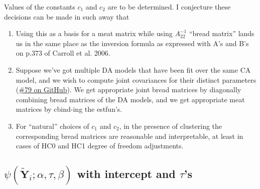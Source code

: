 \documentclass{article}
\begin{document}
Values of the constants $c_{1}$ and $c_{2}$ are to be determined.
I conjecture these decisions can be made in such away that 
\begin{enumerate}
\item Using this as a basis for a meat matrix while using
  $A_{22}^{-1}$  ``bread matrix'' lands us in the same place as the
  inversion formula as expressed with A's and B's on p.373 of Carroll
  et al. 2006.
\item Suppose we've got multiple DA models that have been fit over the
  same CA model, and we wish to compute joint covariances for their
  distinct parameters
  (\href{https://github.com/benbhansen-stats/flexida/issues/79}{\#79
    on GitHub}). We get appropriate joint bread matrices by
  diagonally combining bread matrices of the DA models, and we get
  appropriate meat matrices by cbind-ing the estfun's.
\item For ``natural'' choices of $c_{1}$ and $c_{2}$, in the
  presence of clustering the corresponding bread matrices are
  reasonable and interpretable, at least in cases of HC0 and HC1
  degree of freedom adjustments. 
\end{enumerate}

\subsection{$\psi(\tilde{\mathbf{Y}}_{i};
  \alpha, \tau, \beta)$ with intercept and $\tau$'s}
\label{sec:psit-rho_0-tau}
\end{document}

